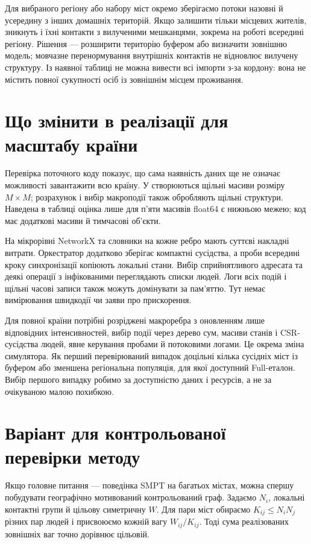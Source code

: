 \documentclass[11pt,a4paper]{article}
\begin{document}
Для вибраного регіону або набору міст окремо зберігаємо потоки назовні й усередину з інших домашніх територій. Якщо залишити тільки місцевих жителів, зникнуть і їхні контакти з вилученими мешканцями, зокрема на роботі всередині регіону. Рішення --- розширити територію буфером або визначити зовнішню модель; мовчазне перенормування внутрішніх контактів не відновлює вилучену структуру. Із наявної таблиці не можна вивести всі імпорти з-за кордону: вона не містить повної сукупності осіб із зовнішнім місцем проживання.

\section{Що змінити в реалізації для масштабу країни}
Перевірка поточного коду показує, що сама наявність даних ще не означає можливості завантажити всю країну. У  створюються щільні масиви розміру $M\times M$; розрахунок і вибір макроподії також обробляють щільні структури. Наведена в таблиці оцінка лише для п'яти масивів float64 є нижньою межею; код має додаткові масиви й тимчасові об'єкти.

На мікрорівні NetworkX та словники на кожне ребро мають суттєві накладні витрати. Оркестратор додатково зберігає компактні сусідства, а проби всередині кроку синхронізації копіюють локальні стани. Вибір сприйнятливого адресата та деякі операції з інфікованими переглядають списки людей. Логи всіх подій і щільні часові записи також можуть домінувати за пам'яттю. Тут немає вимірювання швидкодії чи заяви про прискорення.

Для повної країни потрібні розріджені макроребра з оновленням лише відповідних інтенсивностей, вибір події через дерево сум, масиви станів і CSR-сусідства людей, явне керування пробами й потоковими логами. Це окрема зміна симулятора. Як перший перевірюваний випадок доцільні кілька сусідніх міст із буфером або зменшена регіональна популяція, для якої доступний Full-еталон. Вибір першого випадку робимо за доступністю даних і ресурсів, а не за очікуваною малою похибкою.

\section{Варіант для контрольованої перевірки методу}
Якщо головне питання --- поведінка SMPT на багатьох містах, можна спершу побудувати географічно мотивований контрольований граф. Задаємо $N_i$, локальні контактні групи й цільову симетричну $W$. Для пари міст обираємо $K_{ij}\leq N_iN_j$ різних пар людей і присвоюємо кожній вагу $W_{ij}/K_{ij}$. Тоді сума реалізованих зовнішніх ваг точно дорівнює цільовій.
\end{document}
